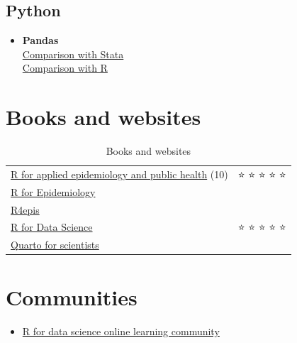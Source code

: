 \documentclass[
  letterpaper,
  DIV=11,
  numbers=noendperiod]{scrreprt}
\providecommand{\tightlist}{%
  \setlength{\itemsep}{0pt}\setlength{\parskip}{0pt}}\usepackage{longtable,booktabs,array}
\begin{document}
\hypertarget{python-4}{%
\subsection{Python}\label{python-4}}

\begin{itemize}
\tightlist
\item
  \textbf{Pandas}\\
  \href{https://pandas.pydata.org/docs/getting_started/comparison/comparison_with_stata.html}{Comparison
  with Stata}\\
  \href{https://pandas.pydata.org/docs/getting_started/comparison/comparison_with_r.html}{Comparison
  with R}
\end{itemize}

\hypertarget{books-and-websites}{%
\section{Books and websites}\label{books-and-websites}}

\begin{longtable}[]{@{}
  >{\raggedright\arraybackslash}p{}
  >{\raggedright\arraybackslash}p{}@{}}
\caption{Books and websites}\tabularnewline
\toprule()
\endhead
\href{https://epirhandbook.com/en/}{R for applied epidemiology and
public health} (10) & {⭐} {⭐} {⭐} {⭐} {⭐} \\
\href{https://www.r4epi.com/}{R for Epidemiology} & \\
\href{https://r4epis.netlify.app/}{R4epis} & \\
\href{https://r4ds.had.co.nz/}{R for Data Science} & {⭐} {⭐} {⭐} {⭐}
{⭐} \\
\href{https://qmd4sci.njtierney.com/}{Quarto for scientists} & \\
\bottomrule()
\end{longtable}

\hypertarget{communities}{%
\section{Communities}\label{communities}}

\begin{itemize}
\tightlist
\item
  \href{https://www.rfordatasci.com/}{R for data science online learning
  community}
\end{itemize}
\end{document}
